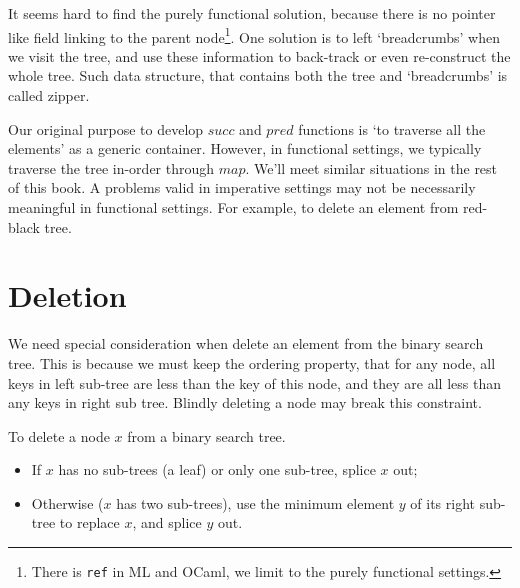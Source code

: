 \documentclass[b5paper]{article}
\begin{document}
It seems hard to find the purely functional solution, because there is no pointer like field linking to the parent node\footnote{There is \texttt{ref} in ML and OCaml, we limit to the purely functional settings.}. One solution is to left `breadcrumbs' when we visit the tree, and use these information to back-track or even re-construct the whole tree. Such data structure, that contains both the tree and `breadcrumbs' is called zipper\cite{zipper-hbook}.

Our original purpose to develop $succ$ and $pred$ functions is `to traverse all the elements' as a generic container. However, in functional settings, we typically traverse the tree in-order through $map$. We'll meet similar situations in the rest of this book. A problems valid in imperative settings may not be necessarily meaningful in functional settings. For example, to delete an element from red-black tree\cite{okasaki-blog}.

\begin{Exercise}


\end{Exercise}

\section{Deletion}
We need special consideration when delete an element from the binary search tree. This is because we must keep the ordering property, that for any node, all keys in left sub-tree are less than the key of this node, and they are all less than any keys in right sub tree. Blindly deleting a node may break this constraint.

To delete a node $x$ from a binary search tree\cite{sgi-stl}.
\begin{itemize}
\item If $x$ has no sub-trees (a leaf) or only one sub-tree, splice $x$ out;
\item Otherwise ($x$ has two sub-trees), use the minimum element $y$ of its right sub-tree to replace $x$, and splice $y$ out.
\end{itemize}
\end{document}
